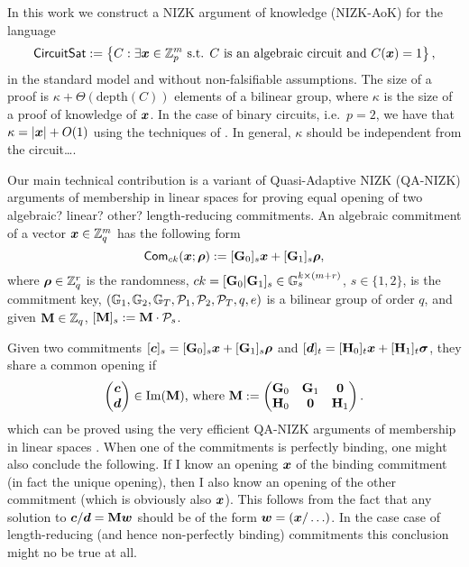 
\newcommand{\setsize}{t}

In this work we construct a NIZK argument of knowledge (NIZK-AoK) for the language
\[
\mathsf{CircuitSat}:=\left\{
	C : \exists {\boldsymbol{x}}\in\mathbb{Z}_p^m \text{ s.t. } C \text{ is an algebraic circuit and } C({\boldsymbol{x}})=1
	\right\},
\]
in the standard model and without non-falsifiable assumptions.
The size of a proof is $\kappa+\Theta(\mathrm{depth}(C))$ elements of a bilinear group, where $\kappa$ is the size of a proof of knowledge of ${\boldsymbol{x}}$. In the case of binary circuits, i.e.~$p=2$, we have that $\kappa=|{\boldsymbol{x}}|+O(1)$ using the techniques of \cite{AC:GonHevRaf15}. {\color{red} In general, $\kappa$ should be independent from the circuit\ldots}.

Our main technical contribution is a variant of Quasi-Adaptive NIZK (QA-NIZK) arguments of membership in linear spaces \cite{AC:JutRoy15,C:LPJY13,C:JutRoy14,EC:AbdBenPoi15,EC:KilWee15,AC:GonHevRaf15} for proving equal opening of two {\color{red}algebraic? linear? other?} length-reducing commitments.
An algebraic commitment of a vector ${\boldsymbol{x}}\in\mathbb{Z}_q^m$ has the following form
$$\mathsf{Com}_{ck}({\boldsymbol{x}};{\boldsymbol{\rho}}) := [\mathbf{{G}}_0]_s{\boldsymbol{x}}+[\mathbf{{G}}_1]_s{\boldsymbol{\rho}},$$
where ${\boldsymbol{\rho}}\in\mathbb{Z}_q^r$ is the randomness, $ck=[\mathbf{{G}}_0|\mathbf{{G}}_1]_s\in\mathbb{G}_s^{k\times(m+r)}$, $s\in\{1,2\}$, is the commitment key, $(\mathbb{G}_1,\mathbb{G}_2,\mathbb{G}_T,\mathcal{P}_1,\mathcal{P}_2,\mathcal{P}_T,q,e)$ is a bilinear group of order $q$, and given $\mathbf{{M}}\in\mathbb{Z}_q$, $[\mathbf{{M}}]_s:=\mathbf{{M}}\cdot \mathcal{P}_s$.

Given two commitments $[{\boldsymbol{c}}]_s=[\mathbf{{G}}_0]_s{\boldsymbol{x}}+[\mathbf{{G}}_1]_s{\boldsymbol{\rho}}$ and $[{\boldsymbol{d}}]_t=[\mathbf{{H}}_0]_t{\boldsymbol{x}}+[\mathbf{{H}}_1]_t{\boldsymbol{\sigma}}$, they share a common opening if
$$
\begin{pmatrix}{\boldsymbol{c}}\\{\boldsymbol{d}}\end{pmatrix} \in
\mathrm{Im}(\mathbf{{M}})\text{, where }\mathbf{{M}}:=
\begin{pmatrix}
\mathbf{{G}}_0 & \mathbf{{G}}_1 & \mathbf{{0}}\\
\mathbf{{H}}_0 & \mathbf{{0}}     & \mathbf{{H}}_1
\end{pmatrix}.
$$
which can be proved using the very efficient QA-NIZK arguments of membership in linear spaces \cite{C:JutRoy14,EC:KilWee15,AC:GonHevRaf15}.
When one of the commitments is perfectly binding, one might also conclude the following. If I know an opening ${\boldsymbol{x}}$ of the binding commitment (in fact the unique opening), then I also know an opening of the other commitment (which is obviously also ${\boldsymbol{x}}$). This follows from the fact that any solution to ${\boldsymbol{c}}/{\boldsymbol{d}}=\mathbf{{M}}{\boldsymbol{w}}$ should be of the form ${\boldsymbol{w}}=({\boldsymbol{x}}/\ldots)$. In the case case of length-reducing (and hence non-perfectly binding) commitments this conclusion might no be true at all.

